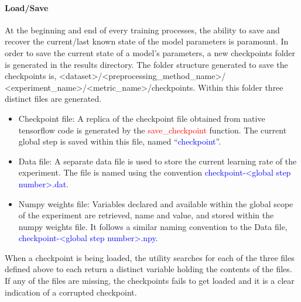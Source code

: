 \documentclass{llncs}
\begin{document}
\paragraph{Load/Save}
At the beginning and end of every training processes, the ability to save and recover the current/last known state of the model parameters is paramount.
In order to save the current state of a model's parameters, a new checkpoints folder is generated in the results directory.
The folder structure generated to save the checkpoints is, \textless dataset\textgreater/\textless preprocessing\_method\_name\textgreater/\\\textless experiment\_name\textgreater/\textless metric\_name\textgreater/checkpoints.
Within this folder three distinct files are generated.
\begin{itemize}
\item Checkpoint file: A replica of the checkpoint file obtained from native tensorflow code is generated by the \textcolor{red}{save\_checkpoint} function.
The current global step is saved within this file, named ``\textcolor{blue}{checkpoint}''.
\item Data file: A separate data file is used to store the current learning rate of the experiment.
The file is named using the convention \textcolor{blue}{checkpoint-\textless global step number\textgreater .dat}.
\item Numpy weights file: Variables declared and available within the global scope of the experiment are retrieved, name and value, and stored within the numpy weights file.
It follows a similar naming convention to the Data file, \textcolor{blue}{checkpoint-\textless global step number\textgreater .npy}.
\end{itemize}

When a checkpoint is being loaded, the utility searches for each of the three files defined above to each return a distinct variable holding the contents of the files.
If any of the files are missing, the checkpoints fails to get loaded and it is a clear indication of a corrupted checkpoint.
\end{document}
